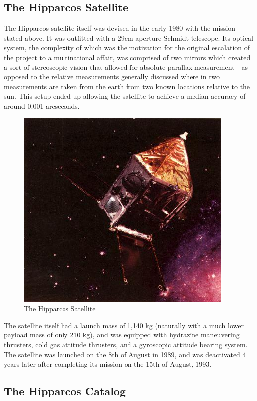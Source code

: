\documentclass{business-covered} %
\begin{document}
		\subsection{The Hipparcos Satellite}
			The Hipparcos satellite itself was devised in the early 1980 with the mission stated above. It was outfitted with a 29cm aperture Schmidt telescope. Its optical system, the complexity of which was the motivation for the original escalation of the project to a multinational affair, was comprised of two mirrors which created a sort of stereoscopic vision that allowed for absolute parallax measurement - as opposed to the relative measurements generally discussed where in two measurements are taken from the earth from two known locations relative to the sun. This setup ended up allowing the satellite to achieve a median accuracy of around 0.001 arcseconds.
			\begin{figure}[h!]
				\centering
				\includegraphics[scale=1]{figures/hipparchos.jpg}
				\caption{The Hipparcos Satellite \cite{nasa}}
			\end{figure}
			The satellite itself had a launch mass of 1,140 kg (naturally with a much lower payload mass of only 210 kg), and was equipped with hydrazine maneuvering thrusters, cold gas attitude thrusters, and a gyroscopic attitude bearing system. The satellite was launched on the 8th of August in 1989, and was deactivated 4 years later after completing its mission on the 15th of August, 1993.
		
\pagebreak
		\subsection{The Hipparcos Catalog}
			
\end{document}
